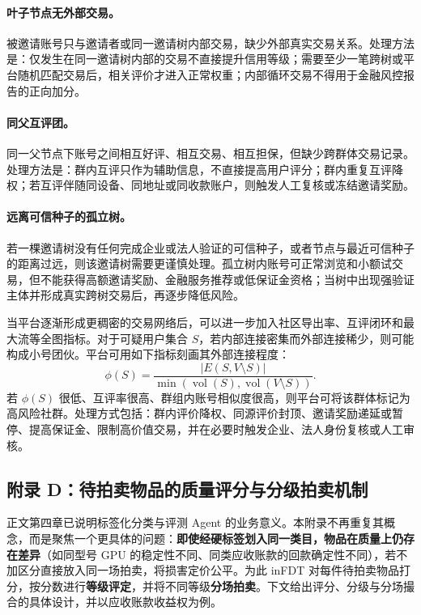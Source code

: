 \documentclass[UTF8,a4paper,12pt]{ctexart}
\begin{document}
\paragraph{叶子节点无外部交易。}
被邀请账号只与邀请者或同一邀请树内部交易，缺少外部真实交易关系。处理方法是：仅发生在同一邀请树内部的交易不直接提升信用等级；需要至少一笔跨树或平台随机匹配交易后，相关评价才进入正常权重；内部循环交易不得用于金融风控报告的正向加分。

\paragraph{同父互评团。}
同一父节点下账号之间相互好评、相互交易、相互担保，但缺少跨群体交易记录。处理方法是：群内互评只作为辅助信息，不直接提高用户评分；群内重复互评降权；若互评伴随同设备、同地址或同收款账户，则触发人工复核或冻结邀请奖励。

\paragraph{远离可信种子的孤立树。}
若一棵邀请树没有任何完成企业或法人验证的可信种子，或者节点与最近可信种子的距离过远，则该邀请树需要更谨慎处理。孤立树内账号可正常浏览和小额试交易，但不能获得高额邀请奖励、金融服务推荐或低保证金资格；当树中出现强验证主体并形成真实跨树交易后，再逐步降低风险。

当平台逐渐形成更稠密的交易网络后，可以进一步加入社区导出率、互评闭环和最大流等全图指标。对于可疑用户集合 $S$，若内部连接密集而外部连接稀少，则可能构成小号团伙。平台可用如下指标刻画其外部连接程度：
\[
    \phi(S)
    =
    \frac{|E(S,V\setminus S)|}
    {\min(\operatorname{vol}(S),\operatorname{vol}(V\setminus S))}.
\]
若 $\phi(S)$ 很低、互评率很高、群组内账号相似度很高，则平台可将该群体标记为高风险社群。处理方式包括：群内评价降权、同源评价封顶、邀请奖励递延或暂停、提高保证金、限制高价值交易，并在必要时触发企业、法人身份复核或人工审核。


\subsection{附录 D：待拍卖物品的质量评分与分级拍卖机制}

正文第四章已说明标签化分类与评测 Agent 的业务意义。本附录不再重复其概念，而是聚焦一个更具体的问题：\textbf{即使经硬标签划入同一类目，物品在质量上仍存在差异}（如同型号 GPU 的稳定性不同、同类应收账款的回款确定性不同），若不加区分直接放入同一场拍卖，将损害定价公平。为此 inFDT 对每件待拍卖物品打分，按分数进行\textbf{等级评定}，并将不同等级\textbf{分场拍卖}。下文给出评分、分级与分场撮合的具体设计，并以应收账款收益权为例。
\end{document}
